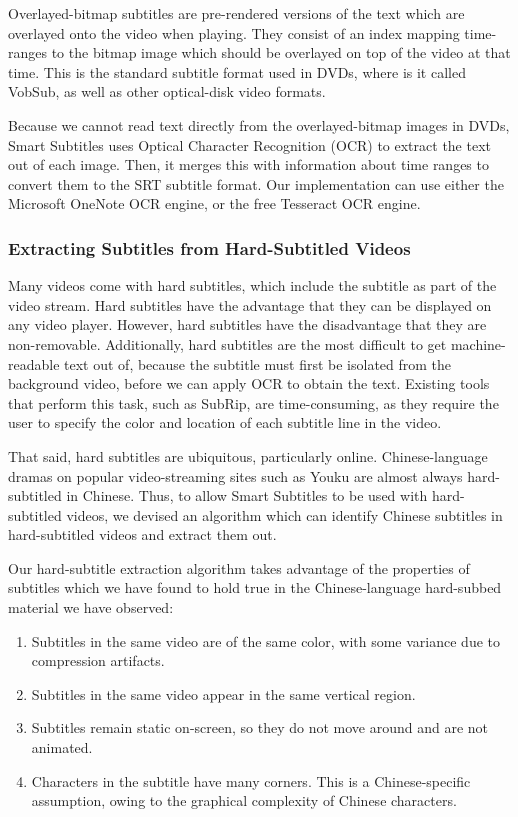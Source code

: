 \documentclass{sigchi}
\begin{document}
Overlayed-bitmap subtitles are pre-rendered versions of the text which are overlayed onto the video when playing. They consist of an index mapping time-ranges to the bitmap image which should be overlayed on top of the video at that time. This is the standard subtitle format used in DVDs, where is it called VobSub, as well as other optical-disk video formats.

Because we cannot read text directly from the overlayed-bitmap images in DVDs, Smart Subtitles uses Optical Character Recognition (OCR) to extract the text out of each image. Then, it merges this with information about time ranges to convert them to the SRT subtitle format. Our implementation can use either the Microsoft OneNote \cite{onenote} OCR engine, or the free Tesseract \cite{tesseract} OCR engine.

\subsubsection{Extracting Subtitles from Hard-Subtitled Videos}

Many videos come with hard subtitles, which include the subtitle as part of the video stream. Hard subtitles have the advantage that they can be displayed on any video player. However, hard subtitles have the disadvantage that they are non-removable. Additionally, hard subtitles are the most difficult to get machine-readable text out of, because the subtitle must first be isolated from the background video, before we can apply OCR to obtain the text. Existing tools that perform this task, such as SubRip, are time-consuming, as they require the user to specify the color and location of each subtitle line in the video.

That said, hard subtitles are ubiquitous, particularly online. Chinese-language dramas on popular video-streaming sites such as Youku are almost always hard-subtitled in Chinese. Thus, to allow Smart Subtitles to be used with hard-subtitled videos, we devised an algorithm which can identify Chinese subtitles in hard-subtitled videos and extract them out.

Our hard-subtitle extraction algorithm takes advantage of the properties of subtitles which we have found to hold true in the Chinese-language hard-subbed material we have observed:

\begin{enumerate}[noitemsep]
\item Subtitles in the same video are of the same color, with some variance due to compression artifacts.
\item Subtitles in the same video appear in the same vertical region.
\item Subtitles remain static on-screen, so they do not move around and are not animated.
\item Characters in the subtitle have many corners. This is a Chinese-specific assumption, owing to the graphical complexity of Chinese characters.
\end{enumerate}
\end{document}
